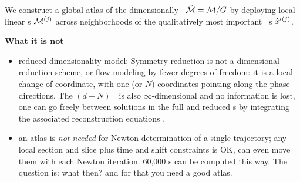 We construct a
global atlas of the dimensionally \reducedsp\ $\hat{\cal M} = {\cal M}/G$ by
deploying local linear \slice s  ${\cal M}{}^{(j)}$ across neighborhoods of
the qualitatively most important \template\ {\cohStr s}
${\hat{x}'}{}^{(j)}$.

    \ifdraft\color{blue}
{\bf What it is not}
    \begin{itemize}
      \item reduced-dimensionality model: Symmetry reduction is not a
          dimensional-reduction scheme, or flow modeling by fewer degrees
          of freedom: it is a local change of coordinate, with one (or
          $N$) coordinates pointing along the phase directions. The
          $(d\!-\!N)$\dmn\ \reducedsp\ is also $\infty$-dimensional and
          no information is lost, one can go freely between solutions in
          the full and reduced \statesp s by integrating the associated
          {reconstruction equations} .
      \item an atlas is \emph{not needed} for Newton determination of a
            single trajectory; any local section and slice plus time and shift
            constraints is OK, can even move them with each Newton
            iteration. 60,000 \rpo s can be computed this way.
            The question is: what then? and for that you need a good atlas.
    \end{itemize}

    \color{black}\fi
